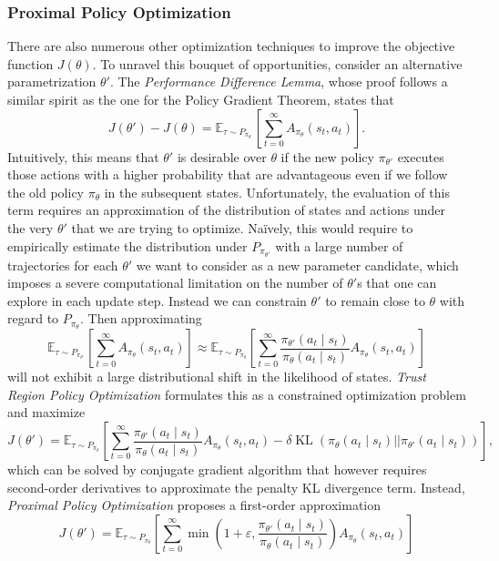 \documentclass[a4paper, 11pt]{article}
\begin{document}
	\subsubsection{Proximal Policy Optimization}
	There are also numerous other optimization techniques to improve the objective function $J(\theta)$. To unravel this bouquet of opportunities, consider an alternative parametrization $\theta'$. The \textit{Performance Difference Lemma}, whose proof follows a similar spirit as the one for the Policy Gradient Theorem, states that 
	\[J(\theta')-J(\theta)=\mathbb{E}_{\tau\sim P_{\pi_{\theta'}}}\left[\sum_{t=0}^{\infty} A_{\pi_{\theta}}(s_t,a_t) \right].\]
	Intuitively, this means that $\theta'$ is desirable over $\theta$ if the new policy $\pi_{\theta'}$ executes those actions with a higher probability that are advantageous even if we follow the old policy $\pi_{\theta}$ in the subsequent states. Unfortunately, the evaluation of this term requires an approximation of the distribution of states and actions under the very $\theta'$ that we are trying to optimize. Na\"ively, this would require to empirically estimate the distribution under $P_{\pi_{\theta'}}$ with a large number of trajectories for each $\theta'$ we want to consider as a new parameter candidate, which imposes a severe computational limitation on the number of $\theta'$s that one can explore in each update step.
	Instead we can constrain $\theta'$ to remain close to $\theta$ with regard to $P_{\pi_{\theta}}$. Then approximating 
	\[\mathbb{E}_{\tau\sim P_{\pi_{\theta'}}}\left[\sum_{t=0}^{\infty} A_{\pi_{\theta}}(s_t,a_t) \right]\approx\mathbb{E}_{\tau\sim P_{\pi_{\theta}}}\left[\sum_{t=0}^{\infty} \frac{\pi_{\theta'}(a_t\mid s_t)}{\pi_{\theta}(a_t\mid s_t)}A_{\pi_{\theta}}(s_t,a_t) \right]\]
	will not exhibit a large distributional shift in the likelihood of states. \textit{Trust Region Policy Optimization} formulates this as a constrained optimization problem and maximize
	\[J(\theta')=\mathbb{E}_{\tau\sim P_{\pi_{\theta}}}\left[\sum_{t=0}^{\infty} \frac{\pi_{\theta'}(a_t\mid s_t)}{\pi_{\theta}(a_t\mid s_t)}A_{\pi_{\theta}}(s_t,a_t) - \delta \operatorname{KL}\left(\pi_{\theta}(a_t\mid s_t)||\pi_{\theta'}(a_t\mid s_t)\right) \right],\]
	which can be solved by conjugate gradient algorithm that however requires second-order derivatives to approximate the penalty KL divergence term. Instead, \textit{Proximal Policy Optimization} proposes a first-order approximation 
	\[J(\theta')=\mathbb{E}_{\tau\sim P_{\pi_{\theta}}}\left[\sum_{t=0}^{\infty} \min\left(1+\varepsilon,\frac{\pi_{\theta'}(a_t\mid s_t)}{\pi_{\theta}(a_t\mid s_t)}\right)A_{\pi_{\theta}}(s_t,a_t)\right]\]
\end{document}
